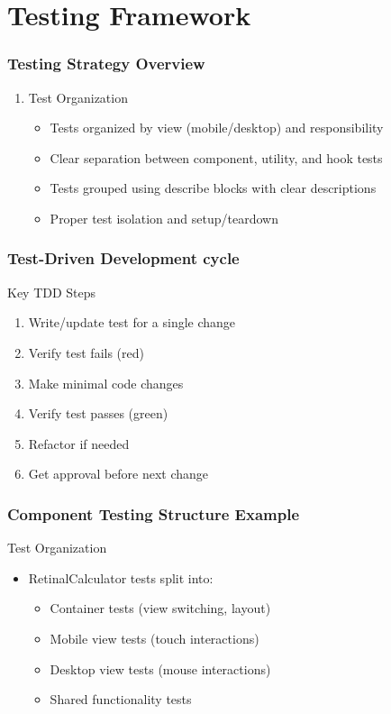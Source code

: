 \documentclass{beamer}
\begin{document}
\section{Testing Framework}
\begin{frame}
    \frametitle{Testing Strategy Overview}
    \begin{enumerate}
        \item Test Organization
        \begin{itemize}
            \item Tests organized by view (mobile/desktop) and responsibility
            \item Clear separation between component, utility, and hook tests
            \item Tests grouped using describe blocks with clear descriptions
            \item Proper test isolation and setup/teardown
        \end{itemize}
    \end{enumerate}
\end{frame}

\begin{frame}
    \frametitle{Test-Driven Development cycle}
    \begin{alertblock}{Key TDD Steps}
        \begin{enumerate}
            \item Write/update test for a single change
            \item Verify test fails (red)
            \item Make minimal code changes
            \item Verify test passes (green)
            \item Refactor if needed
            \item Get approval before next change
        \end{enumerate}
    \end{alertblock}
\end{frame}

\begin{frame}
    \frametitle{Component Testing Structure Example}
    \begin{exampleblock}{Test Organization}
        \begin{itemize}
            \item RetinalCalculator tests split into:
            \begin{itemize}
                \item Container tests (view switching, layout)
                \item Mobile view tests (touch interactions)
                \item Desktop view tests (mouse interactions)
                \item Shared functionality tests
            \end{itemize}
        \end{itemize}
    \end{exampleblock}
\end{frame}
\end{document}
